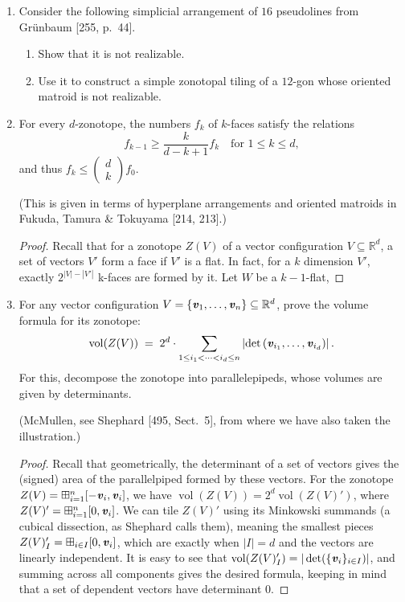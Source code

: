 \documentclass{article}
\begin{document}
\begin{enumerate}
\item Consider the following simplicial arrangement of $16$ pseudolines from Gr\"unbaum [255, p.~44].

\begin{enumerate}[label=(\roman*)]
\item Show that it is not realizable.
\item Use it to construct a simple zonotopal tiling of a $12$-gon whose oriented matroid is not realizable.
\end{enumerate}

\item For every $d$-zonotope, the numbers $f_k$ of $k$-faces satisfy the relations
\[
f_{k-1} \ge \frac{k}{d-k+1}f_k \quad \text{for } 1 \le k \le d,
\]
and thus $f_k \le \begin{pmatrix} d \\ k \end{pmatrix} f_0$.

(This is given in terms of hyperplane arrangements and oriented matroids in Fukuda, Tamura \& Tokuyama [214, 213].)

\begin{proof}
Recall that for a zonotope $Z(V)$ of a vector configuration $V \subseteq \mathbb{R}^d$, a set of vectors $V'$ form a face if $V'$ is a flat. In fact, for a $k$ dimension $V'$, exactly $2^{|V| - |V'|}$ k-faces are formed by it. Let $W$ be a $k-1$-flat, 

\end{proof}

\item For any vector configuration $V=\{\textbf{\textit{v}}_1,\ldots,\textbf{\textit{v}}_n\}\subseteq \mathbb{R}^d$, prove the volume formula for its zonotope:
\[
\operatorname{vol}(Z(V)) \;=\; 2^d \cdot \sum_{1\le i_1<\cdots<i_d\le n}
\left|\det\left(\textbf{\textit{v}}_{i_1},\ldots,\textbf{\textit{v}}_{i_d}\right)\right|.
\]
For this, decompose the zonotope into parallelepipeds, whose volumes are given by determinants.

(McMullen, see Shephard [495, Sect.~5], from where we have also taken the illustration.)

\begin{proof}
Recall that geometrically, the determinant of a set of vectors gives the (signed) area of the parallelpiped formed by these vectors. For the zonotope $Z(V) = \boxplus_{i=1}^n [-\textbf{\textit{v}}_i, \textbf{\textit{v}}_i]$, we have $\operatorname{vol}(Z(V)) = 2^d\operatorname{vol}(Z(V)')$, where $Z(V)' = \boxplus_{i=1}^n [0, \textbf{\textit{v}}_i]$. We can tile $Z(V)'$ using its Minkowski summands (a cubical dissection, as Shephard calls them), meaning the smallest pieces $Z(V)'_I = \boxplus_{i \in I} [0,\textbf{\textit{v}}_i]$, which are exactly when $|I| = d$ and the vectors are linearly independent. It is easy to see that $\operatorname{vol}(Z(V)'_I) = |\det(\{\textbf{\textit{v}}_i\}_{i \in I})|$, and summing across all components gives the desired formula, keeping in mind that a set of dependent vectors have determinant $0$.
\end{proof}


\end{enumerate}
\end{document}
